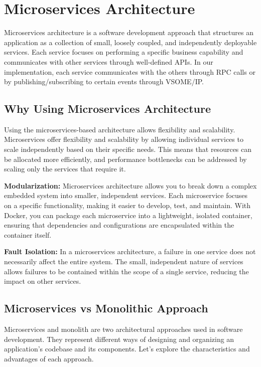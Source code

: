 \documentclass[
12pt,
oneside, 
onehalfspacing, 
nolistspacing, 
parskip, 
chapterinoneline, 
]{AASTCOMPUTER}
\begin{document}
\section{Microservices Architecture}
Microservices architecture is a software development approach that structures an application as a collection of small, loosely coupled, and independently deployable services. Each service focuses on performing a specific business capability and communicates with other services through well-defined APIs. In our implementation, each service communicates with the others through RPC calls or by publishing/subscribing to certain events through VSOME/IP.

\subsection{Why Using Microservices Architecture}
Using the microservices-based architecture allows flexibility and scalability. Microservices offer flexibility and scalability by allowing individual services to scale independently based on their specific needs. This means that resources can be allocated more efficiently, and performance bottlenecks can be addressed by scaling only the services that require it.

\textbf{Modularization:} Microservices architecture allows you to break down a complex embedded system into smaller, independent services. Each microservice focuses on a specific functionality, making it easier to develop, test, and maintain. With Docker, you can package each microservice into a lightweight, isolated container, ensuring that dependencies and configurations are encapsulated within the container itself.

\textbf{Fault Isolation:} In a microservices architecture, a failure in one service does not necessarily affect the entire system. The small, independent nature of services allows failures to be contained within the scope of a single service, reducing the impact on other services.

\subsection{Microservices vs Monolithic Approach}
Microservices and monolith are two architectural approaches used in software development. They represent different ways of designing and organizing an application's codebase and its components. Let's explore the characteristics and advantages of each approach.
\end{document}
